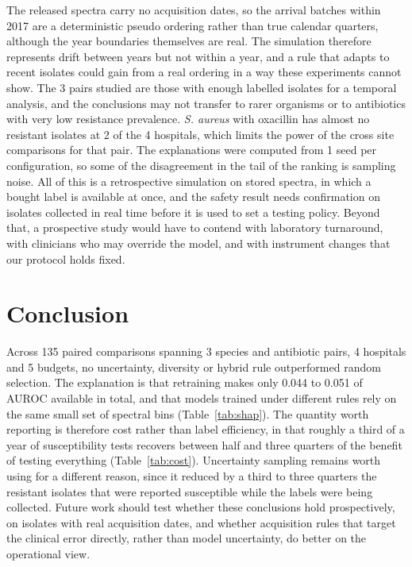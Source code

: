 \documentclass[conference,a4paper]{IEEEtran}
\begin{document}
The released spectra carry no acquisition dates, so the arrival batches within 2017 are a deterministic pseudo ordering rather than true calendar quarters, although the year boundaries themselves are real. The simulation therefore represents drift between years but not within a year, and a rule that adapts to recent isolates could gain from a real ordering in a way these experiments cannot show. The 3 pairs studied are those with enough labelled isolates for a temporal analysis, and the conclusions may not transfer to rarer organisms or to antibiotics with very low resistance prevalence. \textit{S. aureus} with oxacillin has almost no resistant isolates at 2 of the 4 hospitals, which limits the power of the cross site comparisons for that pair. The explanations were computed from 1 seed per configuration, so some of the disagreement in the tail of the ranking is sampling noise. All of this is a retrospective simulation on stored spectra, in which a bought label is available at once, and the safety result needs confirmation on isolates collected in real time before it is used to set a testing policy. Beyond that, a prospective study would have to contend with laboratory turnaround, with clinicians who may override the model, and with instrument changes that our protocol holds fixed.

\section{Conclusion}

Across 135 paired comparisons spanning 3 species and antibiotic pairs, 4 hospitals and 5 budgets, no uncertainty, diversity or hybrid rule outperformed random selection. The explanation is that retraining makes only 0.044 to 0.051 of AUROC available in total, and that models trained under different rules rely on the same small set of spectral bins (Table~\ref{tab:shap}). The quantity worth reporting is therefore cost rather than label efficiency, in that roughly a third of a year of susceptibility tests recovers between half and three quarters of the benefit of testing everything (Table~\ref{tab:cost}). Uncertainty sampling remains worth using for a different reason, since it reduced by a third to three quarters the resistant isolates that were reported susceptible while the labels were being collected. Future work should test whether these conclusions hold prospectively, on isolates with real acquisition dates, and whether acquisition rules that target the clinical error directly, rather than model uncertainty, do better on the operational view.
\end{document}
